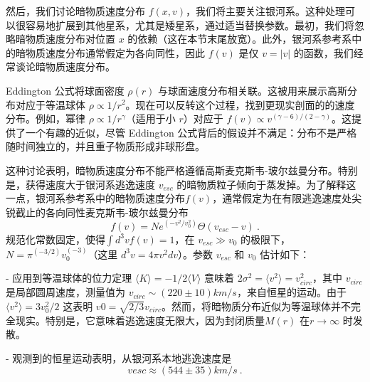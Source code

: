 

然后，我们讨论暗物质速度分布 $f(x, v)$，我们将主要关注银河系。这种处理可以很容易地扩展到其他星系，尤其是矮星系，通过适当替换参数。最初，我们将忽略暗物质速度分布对位置 $x$ 的依赖（这在本节末尾放宽）。此外，银河系参考系中的暗物质速度分布通常假定为各向同性，因此 $f(v)$ 是仅 $v = |v|$ 的函数，我们经常谈论暗物质速度分布。


Eddington 公式将球面密度 $\rho (r)$ 与球面速度分布相关联。这被用来展示高斯分布对应于等温球体 $\rho \propto 1/r^2$。现在可以反转这个过程，找到更现实剖面的的速度分布。例如，幂律 $\rho \propto 1/r^\gamma$（适用于小 $r$）对应于 $f(v) \propto v^{(\gamma-6)/(2-\gamma)}$。这提供了一个有趣的近似，尽管 Eddington 公式背后的假设并不满足：分布不是严格随时间独立的，并且重子物质形成非球形盘。

这种讨论表明，暗物质速度分布不能严格遵循高斯麦克斯韦-玻尔兹曼分布。特别是，获得速度大于银河系逃逸速度 $v_{esc}$ 的暗物质粒子倾向于蒸发掉。为了解释这一点，银河系参考系中的暗物质速度分布$ f(v)$，通常假定为在有限逃逸速度处尖锐截止的各向同性麦克斯韦-玻尔兹曼分布
\begin{equation}
f(v) = N e^{(-v^2/v^2_0)} \Theta (v_{esc} - v)~.
\end{equation}
规范化常数固定，使得$ \int d^3v f(v) = 1$，在 $v_{esc} \gg v_0$ 的极限下，$N = \pi^{(-3/2)}v^{(-3)}_0$（这里 $d^3v = 4\pi v^2 dv$）。参数 $v_{esc}$ 和 $v_0$ 估计如下：

- 应用到等温球体的位力定理 $\langle K\rangle = -1/2\langle V \rangle$ 意味着 $2\sigma^2 = \langle v^2\rangle  = v^2_{circ}$，其中 $v_{circ}$ 是局部圆周速度，测量值为 $v_{circ} \sim (220 \pm 10) km/s$，来自恒星的运动。由于$ \langle v^2\rangle = 3v^2_0/2$ 这表明 $v0 = \sqrt{2/3} v_{circ}$。然而，将暗物质分布近似为等温球体并不完全现实。特别是，它意味着逃逸速度无限大，因为封闭质量$ M(r)$ 在$ r \rightarrow\infty$ 时发散。

- 观测到的恒星运动表明，从银河系本地逃逸速度是
\begin{equation}
vesc ≈ (544 ± 35) km/s~.
\end{equation}

